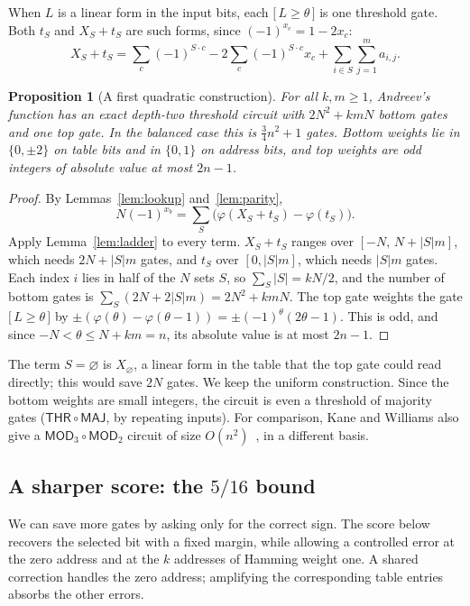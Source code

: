 \documentclass[11pt,letterpaper]{article}
\newtheorem{proposition}[theorem]{Proposition}
\theoremstyle{remark}
\newcommand{\ind}[1]{\bigl[\,#1\,\bigr]}
\newcommand{\subsect}[1]{\subsection*{\texorpdfstring{\color{ink}#1}{#1}}}
\newcommand{\THR}{\mathsf{THR}}
\begin{document}
When $L$ is a linear form in the input bits, each $\ind{L\ge\theta}$ is one
threshold gate. Both $t_S$ and $X_S+t_S$ are such forms, since
$(-1)^{x_c}=1-2x_c$:
\begin{equation}\label{eq:form}
X_S+t_S=\sum_c(-1)^{S\cdot c}-2\sum_c(-1)^{S\cdot c}x_c+\sum_{i\in S}\sum_{j=1}^m a_{i,j}.
\end{equation}

\begin{proposition}[A first quadratic construction]\label{prop:basic}
For all $k,m\ge1$, Andreev's function has an exact depth-two threshold
circuit with $2N^2+kmN$ bottom gates and one top gate. In the balanced case
this is $\tfrac34n^2+1$ gates. Bottom weights lie in $\{0,\pm2\}$ on table
bits and in $\{0,1\}$ on address bits, and
top weights are odd integers of absolute value at most $2n-1$.
\end{proposition}
\begin{proof}
By Lemmas~\ref{lem:lookup} and~\ref{lem:parity},
\[
N(-1)^{x_b}=\sum_S\bigl(\varphi(X_S+t_S)-\varphi(t_S)\bigr).
\]
Apply Lemma~\ref{lem:ladder} to every term. $X_S+t_S$ ranges over
$[-N,\,N+|S|m]$, which needs $2N+|S|m$ gates, and $t_S$ over $[0,|S|m]$,
which needs $|S|m$ gates. Each index $i$ lies in half of the $N$ sets $S$,
so $\sum_S|S|=kN/2$, and the number of bottom gates is
$\sum_S(2N+2|S|m)=2N^2+kmN$. The top gate weights the gate
$\ind{L\ge\theta}$ by $\pm(\varphi(\theta)-\varphi(\theta-1))=\pm(-1)^\theta(2\theta-1)$.
This is odd, and since $-N<\theta\le N+km=n$, its absolute value is at most
$2n-1$.
\end{proof}
The term $S=\varnothing$ is $X_\varnothing$, a linear form in the table that the
top gate could read directly; this would save $2N$ gates. We keep the uniform
construction.
Since the bottom weights are small integers, the circuit is even a threshold
of majority gates ($\THR\circ\mathsf{MAJ}$, by repeating inputs). For
comparison, Kane and Williams also give a $\mathsf{MOD}_3\circ\mathsf{MOD}_2$
circuit of size $O(n^2)$~\cite[Thm.~1.2]{KW}, in a different basis.

\subsect{A sharper score: the \texorpdfstring{$5/16$}{5/16} bound}

We can save more gates by asking only for the correct sign. The score below
recovers the selected bit with a fixed margin, while allowing a controlled
error at the zero address and at the $k$ addresses of Hamming weight one.
A shared correction handles the zero address; amplifying the corresponding
table entries absorbs the other errors.
\end{document}
